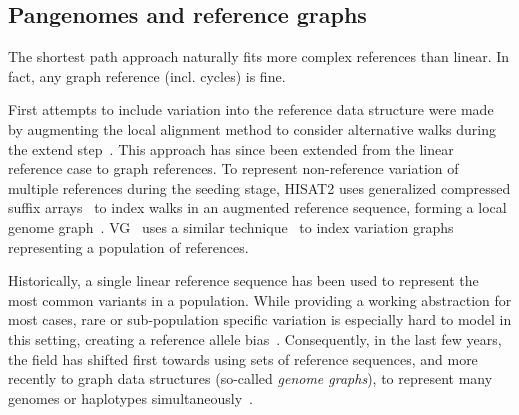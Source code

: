 \subsection{Pangenomes and reference graphs}

The shortest path approach naturally fits more complex references than linear.
In fact, any graph reference (incl. cycles) is fine.

First attempts to include variation into the reference data structure were made
by augmenting the local alignment method to consider alternative walks during the
extend step~\cite{schneeberger_simultaneous_2009,palmapper}. This approach has
since been extended from the linear reference case to graph references. To
represent non-reference variation of multiple references during the seeding
stage, HISAT2 uses generalized compressed suffix
arrays~\cite{siren_indexing_2014} to index walks in an augmented reference
sequence, forming a local genome graph~\cite{kim_graphbased_2019}.
VG~\cite{garrison_variation_2018} uses a similar
technique~\cite{siren_indexing_2017} to index variation graphs representing a
population of references.

Historically, a single linear reference sequence has been used to represent the
most common variants in a population. While providing a working abstraction for
most cases, rare or sub-population specific variation is especially hard to
model in this setting, creating a reference allele
bias~\cite{stevenson_sources_2013,brandt_mapping_2015}. Consequently, in the
last few years, the field has shifted first towards using sets of reference
sequences, and more recently to graph data structures (so-called {\em genome
graphs}), to represent many genomes or haplotypes
simultaneously~\cite{dilthey_improved_2015,paten_genome_2017,garrison_variation_2018}.